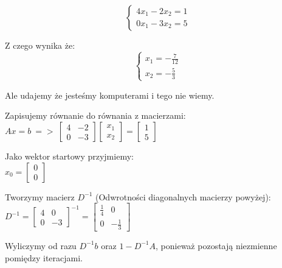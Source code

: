 \documentclass{article}
\begin{document}
\begin{equation*}\begin{cases}
    4x_1-2x_2=1\\
    0x_1-3x_2=5
\end{cases}\end{equation*}

Z czego wynika że:
\begin{equation*}\begin{cases}
    x_1=-\frac{7}{12}\\
    x_2=-\frac{5}{3}
\end{cases}\end{equation*}

Ale udajemy że jesteśmy komputerami i tego nie wiemy.

Zapisujemy równanie do równania z macierzami:\\
$Ax=b\:=>\:\begin{bmatrix} 4 & -2 \\ 0 & -3 \end{bmatrix} \begin{bmatrix} x_1 \\ x_2 \end{bmatrix} = \begin{bmatrix} 1 \\ 5 \end{bmatrix}$

Jako wektor startowy przyjmiemy:\\
$x_0=\begin{bmatrix} 0 \\ 0 \end{bmatrix}$

Tworzymy macierz $D^{-1}$ (Odwrotności diagonalnych macierzy powyżej):\\
$D^{-1}=\begin{bmatrix} 4 & 0 \\ 0 & -3 \end{bmatrix}^{-1} = \begin{bmatrix} \frac{1}{4} & 0 \\ 0 & -\frac{1}{3} \end{bmatrix}$

Wyliczymy od razu $D^{-1}b$ oraz $1-D^{-1}A$, ponieważ pozostają niezmienne pomiędzy iteracjami.
\end{document}
